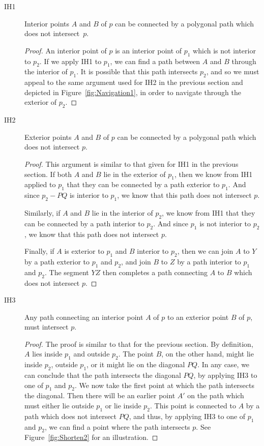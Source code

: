 \begin{description}
\item[IH1] Interior points $A$ and $B$ of $p$ can be connected by a polygonal path which does not intersect~$p$.
  \begin{proof}
    An interior point of $p$ is an interior point of $p_1$ which is not interior to $p_2$. If we apply IH1 to $p_1$, we can find a path between $A$ and $B$ through the interior of $p_1$. It is possible that this path intersects $p_2$, and so we must appeal to the same argument used for IH2 in the previous section and depicted in Figure~\ref{fig:Navigation1}, in order to navigate through the exterior of $p_2$.
  \end{proof}
\item[IH2] Exterior points $A$ and $B$ of $p$ can be connected by a polygonal path which does not intersect $p$.
  \begin{proof}
    This argument is similar to that given for IH1 in the previous section. If both $A$ and $B$ lie in the exterior of $p_1$, then we know from IH1 applied to $p_1$ that they can be connected by a path exterior to $p_1$. And since $p_2 - PQ$ is interior to $p_1$, we know that this path does not intersect $p$.

    Similarly, if $A$ and $B$ lie in the interior of $p_2$, we know from IH1 that they can be connected by a path interior to $p_2$. And since $p_1$ is not interior to $p_2$, we know that this path does not intersect $p$.

    Finally, if $A$ is exterior to $p_1$ and $B$ interior to $p_2$, then we can join $A$ to $Y$ by a path exterior to $p_1$ and $p_2$, and join $B$ to $Z$ by a path interior to $p_1$ and $p_2$. The segment $YZ$ then completes a path connecting $A$ to $B$ which does not intersect $p$.
    \end{proof}

\item[IH3] Any path connecting an interior point $A$ of $p$ to an exterior point $B$ of $p$, must intersect $p$.
  \begin{proof}
    The proof is similar to that for the previous section. By definition, $A$ lies inside $p_1$ and outside $p_2$. The point $B$, on the other hand, might lie inside $p_2$, outside $p_1$, or it might lie on the diagonal $PQ$. In any case, we can conclude that the path intersects the diagonal $PQ$, by applying IH3 to one of $p_1$ and $p_2$. We now take the first point at which the path intersects the diagonal. Then there will be an earlier point $A'$ on the path which must either lie outside $p_1$ or lie inside $p_2$. This point is connected to $A$ by a path which does not intersect $PQ$, and thus, by applying IH3 to one of $p_1$ and $p_2$, we can find a point where the path intersects $p$. See Figure~\ref{fig:Shorten2} for an illustration.
  \end{proof}


\end{description}
